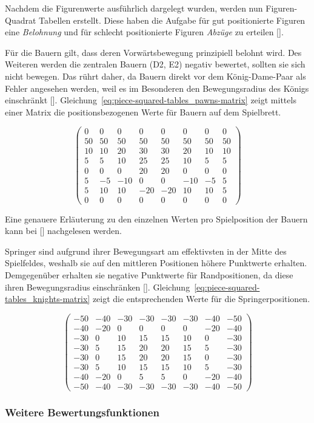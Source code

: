 Nachdem die Figurenwerte ausführlich dargelegt wurden, werden nun Figuren-Quadrat Tabellen erstellt.
Diese haben die Aufgabe für gut positionierte Figuren eine \textit{Belohnung} und für schlecht positionierte Figuren \textit{Abzüge} zu erteilen [\cite{Wiki2018}].

Für die Bauern gilt, dass deren Vorwärtsbewegung prinzipiell belohnt wird.
Des Weiteren werden die zentralen Bauern (D2, E2) negativ bewertet, sollten sie sich nicht bewegen.
Das rührt daher, da Bauern direkt vor dem König-Dame-Paar als Fehler angesehen werden, weil es im Besonderen den Bewegungsradius des Königs einschränkt [\cite{Wiki2018}].
Gleichung~\ref{eq:piece-squared-tables_pawns-matrix} zeigt mittels einer Matrix die positionsbezogenen Werte für Bauern auf dem Spielbrett.

\begin{equation} \label{eq:piece-squared-tables_pawns-matrix}
\begin{pmatrix}
0 & 0 & 0 & 0 & 0 & 0 & 0 & 0 \\
50 & 50 & 50 & 50 & 50 & 50 & 50 & 50 \\
10 & 10 & 20 & 30 & 30 & 20 & 10 & 10 \\
5 & 5 & 10 & 25 & 25 & 10 & 5 & 5 \\
0 & 0 & 0 & 20 & 20 & 0 & 0 & 0 \\
5 & -5 & -10 & 0 & 0 & -10 & -5 & 5 \\
5 & 10 & 10 & -20 & -20 & 10 & 10 & 5 \\
0 & 0 & 0 & 0 & 0 & 0 & 0 & 0
\end{pmatrix}
\end{equation}

\bigskip

\noindent Eine genauere Erläuterung zu den einzelnen Werten pro Spielposition der Bauern kann bei [\cite{Wiki2018}] nachgelesen werden.

Springer sind aufgrund ihrer Bewegungsart am effektivsten in der Mitte des Spielfeldes, weshalb sie auf den mittleren Positionen höhere Punktwerte erhalten.
Demgegenüber erhalten sie negative Punktwerte für Randpositionen, da diese ihren Bewegungsradius einschränken [\cite{Wiki2018}].
Gleichung~\ref{eq:piece-squared-tables_knights-matrix} zeigt die entsprechenden Werte für die Springerpositionen.

\begin{equation} \label{eq:piece-squared-tables_knights-matrix}
\begin{pmatrix}
-50 & -40 & -30 & -30 & -30 & -30 & -40 & -50 \\
-40 & -20 & 0 & 0 & 0 & 0 & -20 & -40 \\
-30 & 0 & 10 & 15 & 15 & 10 & 0 & -30 \\
-30 & 5 & 15 & 20 & 20 & 15 & 5 & -30 \\
-30 & 0 & 15 & 20 & 20 & 15 & 0 & -30 \\
-30 & 5 & 10 & 15 & 15 & 10 & 5 & -30 \\
-40 & -20 & 0 & 5 & 5 & 0 & -20 & -40 \\
-50 & -40 & -30 & -30 & -30 & -30 & -40 & -50
\end{pmatrix}
\end{equation}


\subsubsection{Weitere Bewertungsfunktionen}

